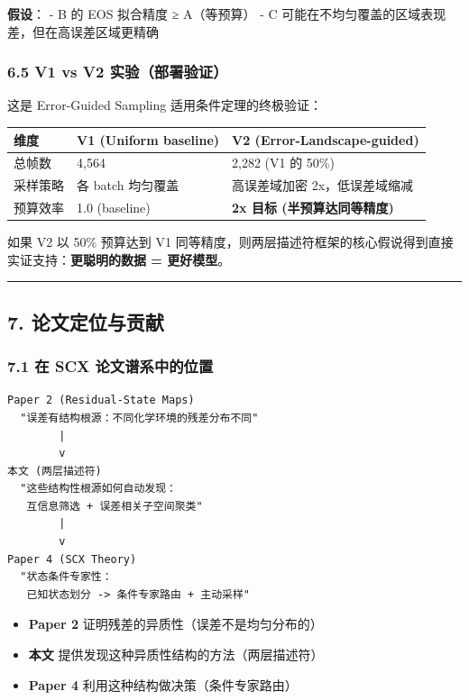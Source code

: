 \documentclass[
  12pt,
]{ctexart}
\providecommand{\tightlist}{%
  \setlength{\itemsep}{0pt}\setlength{\parskip}{0pt}}
\begin{document}
\textbf{假设}： - B 的 EOS 拟合精度 ≥ A（等预算） - C
可能在不均匀覆盖的区域表现差，但在高误差区域更精确

\subsubsection{6.5 V1 vs V2
实验（部署验证）}\label{v1-vs-v2-ux5b9eux9a8cux90e8ux7f72ux9a8cux8bc1}

这是 Error-Guided Sampling 适用条件定理的终极验证：

\begin{longtable}[]{@{}lll@{}}
\toprule\noalign{}
维度 & V1 (Uniform baseline) & V2 (Error-Landscape-guided) \\
\midrule\noalign{}
\endhead
\bottomrule\noalign{}
\endlastfoot
总帧数 & 4,564 & 2,282 (V1 的 50\%) \\
采样策略 & 各 batch 均匀覆盖 & 高误差域加密 2x，低误差域缩减 \\
预算效率 & 1.0 (baseline) & \textbf{2x 目标 (半预算达同等精度)} \\
\end{longtable}

如果 V2 以 50\% 预算达到 V1
同等精度，则两层描述符框架的核心假说得到直接实证支持：\textbf{更聪明的数据
= 更好模型}。

\begin{center}\rule{0.5\linewidth}{0.5pt}\end{center}

\subsection{7.
论文定位与贡献}\label{ux8bbaux6587ux5b9aux4f4dux4e0eux8d21ux732e}

\subsubsection{7.1 在 SCX
论文谱系中的位置}\label{ux5728-scx-ux8bbaux6587ux8c31ux7cfbux4e2dux7684ux4f4dux7f6e}

\begin{verbatim}
Paper 2 (Residual-State Maps)
  "误差有结构根源：不同化学环境的残差分布不同"
        |
        v
本文 (两层描述符)
  "这些结构性根源如何自动发现：
   互信息筛选 + 误差相关子空间聚类"
        |
        v
Paper 4 (SCX Theory)
  "状态条件专家性：
   已知状态划分 -> 条件专家路由 + 主动采样"
\end{verbatim}

\begin{itemize}
\tightlist
\item
  \textbf{Paper 2} 证明残差的异质性（误差不是均匀分布的）
\item
  \textbf{本文} 提供发现这种异质性结构的方法（两层描述符）
\item
  \textbf{Paper 4} 利用这种结构做决策（条件专家路由）
\end{itemize}
\end{document}
